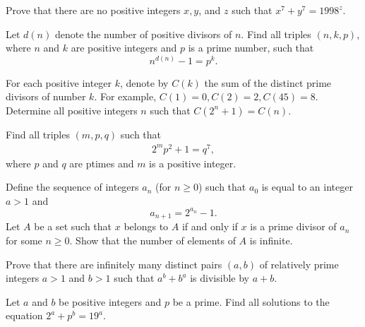 \documentclass{subfile}
\begin{document}
	\begin{problem} %
		Prove that there are no positive integers $x,y$, and $z$ such that $x^7+y^7=1998^z$.
	\end{problem}

	\begin{problem} %
		Let $d(n)$ denote the number of positive divisors of $n$. Find all triples $(n,k,p)$, where $n$ and $k$ are positive integers and $p$ is a prime number, such that
		\[n^{d(n)} - 1 = p^k.\]
	\end{problem}

	\begin{problem}[IZHO 2017] %
		For each positive integer $k$, denote by $C(k)$ the sum of the distinct prime divisors of number $k$. For example, $C(1)=0,C(2)=2,C(45)=8$. Determine all positive integers $n$ such that $C(2^n+1)=C(n)$.
	\end{problem}

	\begin{problem} %
		Find all triples $(m,p,q)$ such that
		\begin{align*} 2^mp^2 +1=q^7, \end{align*}where $p$ and $q$ are ptimes and $m$ is a positive integer.
	\end{problem}

	\begin{problem}[Brazil 2016] %
		Define the sequence of integers $a_n$ (for $n \geq 0$) such that $a_0$ is equal to an integer $a>1$ and $$a_{n+1}=2^{a_n}-1.$$
		Let $A$ be a set such that $x$ belongs to $A$ if and only if $x$ is a prime divisor of $a_n$ for some $n \geq 0$. Show that the number of elements of $A$ is infinite.
	\end{problem}

	\begin{problem}[USAMO‌2017] %
		Prove that there are infinitely many distinct pairs $(a, b)$ of relatively prime integers $a>1$ and $b>1$ such that $a^b+b^a$ is divisible by $a+b$.
	\end{problem}

	\begin{problem} %
		Let $a$ and $b$ be positive integers and $p$ be a prime. Find all solutions to the equation $2^a+p^b=19^a$.
	\end{problem}
\end{document}
